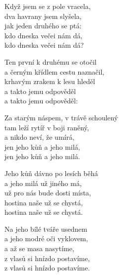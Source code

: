 
\ve{}
Když jsem se z pole vracela,\\
dva havrany jsem slyšela,\\
jak jeden druhého se ptá:\\
kdo dneska večei nám dá,\\
kdo dneska večei nám dá?

\ve{}
Ten první k druhému se otočil\\
a černým křídlem cestu naznačil,\\
krhavým zrakem k lesu hleděl\\
a takto jemu odpověděl\\
a takto jemu odpověděl:

\ve{}
Za starým náspem, v trávě schoulený\\
tam leží rytíř v boji raněný,\\
a nikdo neví, že umírá,\\
jen jeho kůň a jeho milá,\\
jen jeho kůň a jeho milá.

\ve{}
Jeho kůň dávno po lesích běhá\\
a jeho milá už jiného má,\\
už pro nás bude dosti místa,\\
hostina naše už se chystá,\\
hostina naše už se chystá.

\ve{}
Na jeho bílé tváře usednem\\
a jeho modré oči vyklovem,\\
a až se masa nasytíme,\\
z vlasů si hnízdo postavíme,\\
z vlasů si hnízdo postavíme.

\esong